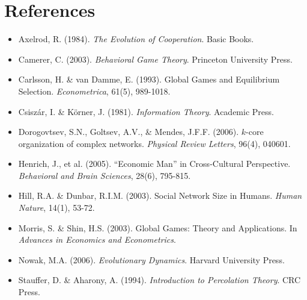 \documentclass[11pt]{article}
\begin{document}
\section*{References}

\small
\begin{itemize}
\item Axelrod, R. (1984). \textit{The Evolution of Cooperation}. Basic Books.
\item Camerer, C. (2003). \textit{Behavioral Game Theory}. Princeton University Press.
\item Carlsson, H. \& van Damme, E. (1993). Global Games and Equilibrium Selection. \textit{Econometrica}, 61(5), 989-1018.
\item Csiszár, I. \& Körner, J. (1981). \textit{Information Theory}. Academic Press.
\item Dorogovtsev, S.N., Goltsev, A.V., \& Mendes, J.F.F. (2006). $k$-core organization of complex networks. \textit{Physical Review Letters}, 96(4), 040601.
\item Henrich, J., et al. (2005). ``Economic Man'' in Cross-Cultural Perspective. \textit{Behavioral and Brain Sciences}, 28(6), 795-815.
\item Hill, R.A. \& Dunbar, R.I.M. (2003). Social Network Size in Humans. \textit{Human Nature}, 14(1), 53-72.
\item Morris, S. \& Shin, H.S. (2003). Global Games: Theory and Applications. In \textit{Advances in Economics and Econometrics}.
\item Nowak, M.A. (2006). \textit{Evolutionary Dynamics}. Harvard University Press.
\item Stauffer, D. \& Aharony, A. (1994). \textit{Introduction to Percolation Theory}. CRC Press.
\end{itemize}
\end{document}
